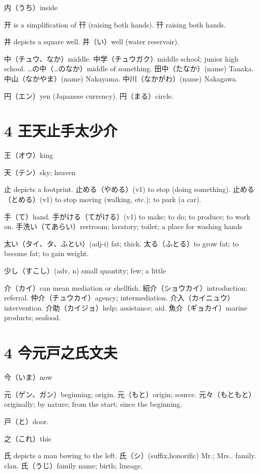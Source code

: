 内（うち）inside

开 is a simplification of 幵 (raising both hands).
幵 raising both hands.

井 depicts a square well.
井（い）well (water reservoir).

中（チュウ、なか）middle.
中学（チュウガク）middle school; junior high school.
…の中（…のなか）middle of something.
田中（たなか）(name) Tanaka.
中山（なかやま）(name) Nakayama.
中川（なかがわ）(name) Nakagawa.

円（エン）yen (Japanese currency).
円（まる）circle.

\section{4 王天止手太少介}

王（オウ）king

天（テン）sky; heaven

止 depicts a footprint.
止める（やめる）(v1) to stop (doing something).
止める（とめる）(v1) to stop moving (walking, etc.); to park (a car).

手（て）hand.
手がける（てがける）(v1) to make; to do; to produce; to work on.
手洗い（てあらい）restroom; lavatory; toilet; a place for washing hands

太い（タイ、タ、ふとい）(adj-i) fat; thick.
太る（ふとる）to grow fat; to become fat; to gain weight.

少し（すこし）(adv, n) small quantity; few; a little

介（カイ）can mean mediation or shellfish.
紹介（ショウカイ）introduction; referral.
仲介（チュウカイ）agency; intermediation.
介入（カイニュウ）intervention.
介助（カイジョ）help; assistance; aid.
魚介（ギョカイ）marine products; seafood.

\section{4 今元戸之氏文夫}

今（いま）now

元（ゲン、ガン）beginning; origin.
元（もと）origin; source.
元々（もともと）
originally; by nature; from the start; since the beginning.

戸（と）door.

之（これ）this

氏 depicts a man bowing to the left.
氏（シ）(suffix,honorific) Mr.; Mrs.. family. clan.
氏（うじ）family name; birth; lineage.

